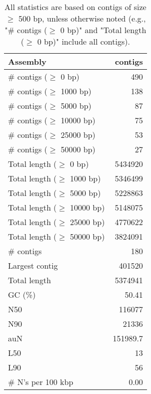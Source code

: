 \documentclass[12pt,a4paper]{article}
\begin{document}
\begin{table}[ht]
\begin{center}
\caption{All statistics are based on contigs of size $\geq$ 500 bp, unless otherwise noted (e.g., "\# contigs ($\geq$ 0 bp)" and "Total length ($\geq$ 0 bp)" include all contigs).}
\begin{tabular}{|l*{1}{|r}|}
\hline
Assembly & contigs \\ \hline
\# contigs ($\geq$ 0 bp) & 490 \\ \hline
\# contigs ($\geq$ 1000 bp) & 138 \\ \hline
\# contigs ($\geq$ 5000 bp) & 87 \\ \hline
\# contigs ($\geq$ 10000 bp) & 75 \\ \hline
\# contigs ($\geq$ 25000 bp) & 53 \\ \hline
\# contigs ($\geq$ 50000 bp) & 27 \\ \hline
Total length ($\geq$ 0 bp) & 5434920 \\ \hline
Total length ($\geq$ 1000 bp) & 5346499 \\ \hline
Total length ($\geq$ 5000 bp) & 5228863 \\ \hline
Total length ($\geq$ 10000 bp) & 5148075 \\ \hline
Total length ($\geq$ 25000 bp) & 4770622 \\ \hline
Total length ($\geq$ 50000 bp) & 3824091 \\ \hline
\# contigs & 180 \\ \hline
Largest contig & 401520 \\ \hline
Total length & 5374941 \\ \hline
GC (\%) & 50.41 \\ \hline
N50 & 116077 \\ \hline
N90 & 21336 \\ \hline
auN & 151989.7 \\ \hline
L50 & 13 \\ \hline
L90 & 56 \\ \hline
\# N's per 100 kbp & 0.00 \\ \hline
\end{tabular}
\end{center}
\end{table}
\end{document}
